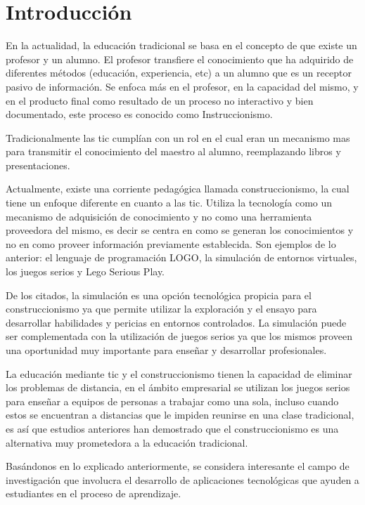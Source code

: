 \chapter{Introducción}

En la actualidad, la educación tradicional se basa en el concepto de que existe
un profesor y un alumno. El profesor transfiere el conocimiento que ha adquirido
de diferentes métodos (educación, experiencia, etc) a un alumno que es un
receptor pasivo de información\cite{laptop:instructionism}. Se enfoca más en el
profesor, en la capacidad del mismo, y en el producto final como resultado de un
proceso no interactivo y bien documentado\cite{igi:instructionism}, este proceso
es conocido como Instruccionismo.

Tradicionalmente las \Gls{tic} cumplían con un rol en el cual eran un mecanismo
mas para transmitir el conocimiento del maestro al alumno, reemplazando libros y
presentaciones.

Actualmente, existe una corriente pedagógica llamada construccionismo, la cual
tiene un enfoque diferente en cuanto a las \Gls{tic}. Utiliza la tecnología como un
mecanismo de adquisición de conocimiento y no como una herramienta proveedora
del mismo\cite{sasha:construtivism}, es decir se centra en como se generan los
conocimientos y no en como proveer información previamente establecida. Son
ejemplos de lo anterior: el lenguaje de programación LOGO, la simulación de
entornos virtuales, los juegos serios y Lego Serious Play.

De los citados, la simulación es una opción tecnológica propicia para el
construccionismo ya que permite utilizar la exploración y el ensayo para
desarrollar habilidades y pericias en entornos
controlados\cite{humphreys2013developing}. La simulación puede ser complementada
con la utilización de juegos serios ya que los mismos proveen una oportunidad
muy importante para enseñar y desarrollar profesionales\cite{sg:aoverview}.

La educación mediante \Gls{tic} y el construccionismo tienen la capacidad de
eliminar los problemas de distancia, en el ámbito empresarial se utilizan los
juegos serios para enseñar a equipos de personas a trabajar como una sola,
incluso cuando estos se encuentran a distancias que le impiden reunirse en una
clase tradicional\cite{mariluz:seiousgames}, es así que estudios anteriores han
demostrado que el construccionismo es una alternativa muy prometedora a la
educación tradicional\cite{sasha:construtivism}.

Basándonos en lo explicado anteriormente, se considera interesante el campo de
investigación que involucra el desarrollo de aplicaciones tecnológicas que
ayuden a estudiantes en el proceso de aprendizaje. 


